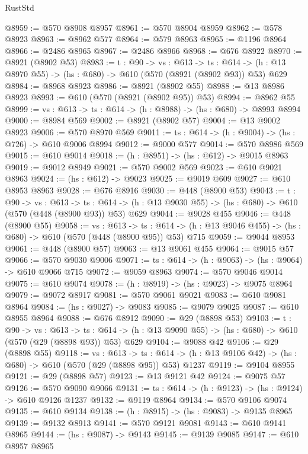 \begin{lexlean}{RustStd}
\begin{coremodule}
@8959 := @570 @8908 @8957
@8961 := @570 @8904 @8959
@8962 := @578 @8923
@8963 := @8962 @577
@8964 := @579 @8963
@8965 := @1196 @8964
@8966 := @2486 @8965
@8967 := @2486 @8966
@8968 := @676 @8922
@8970 := @8921 (@8902 @53)
@8983 := {t : @90} ->
  {vs : @613} ->
  {ts : @614} -> (h : @13 @8970 @55) -> (hs : @680) -> @610 (@570 (@8921 (@8902 @93)) @53) @629
@8984 := @8968 @8923
@8986 := @8921 (@8902 @55)
@8988 := @13 @8986 @8923
@8993 := @610 (@570 (@8921 (@8902 @95)) @53)
@8994 := @8962 @55
@8999 := {vs : @613} -> {ts : @614} -> (h : @8988) -> (hs : @680) -> @8993 @8994
@9000 := @8984 @569
@9002 := @8921 (@8902 @57)
@9004 := @13 @9002 @8923
@9006 := @570 @8970 @569
@9011 := {ts : @614} -> (h : @9004) -> (hs : @726) -> @610 @9006 @8994
@9012 := @9000 @577
@9014 := @570 @8986 @569
@9015 := @610 @9014
@9018 := (h : @8951) -> (hs : @612) -> @9015 @8963
@9019 := @9012 @8949
@9021 := @570 @9002 @569
@9023 := @610 @9021 @8963
@9024 := (hs : @612) -> @9023
@9025 := @9019 @609
@9027 := @610 @8953 @8963
@9028 := @676 @8916
@9030 := @448 (@8900 @53)
@9043 := {t : @90} ->
  {vs : @613} ->
  {ts : @614} -> (h : @13 @9030 @55) -> (hs : @680) -> @610 (@570 (@448 (@8900 @93)) @53) @629
@9044 := @9028 @455
@9046 := @448 (@8900 @55)
@9058 := {vs : @613} ->
  {ts : @614} -> (h : @13 @9046 @455) -> (hs : @680) -> @610 (@570 (@448 (@8900 @95)) @53) @715
@9059 := @9044 @8953
@9061 := @448 (@8900 @57)
@9063 := @13 @9061 @455
@9064 := @9015 @57
@9066 := @570 @9030 @9006
@9071 := {ts : @614} -> (h : @9063) -> (hs : @9064) -> @610 @9066 @715
@9072 := @9059 @8963
@9074 := @570 @9046 @9014
@9075 := @610 @9074
@9078 := (h : @8919) -> (hs : @9023) -> @9075 @8964
@9079 := @9072 @8917
@9081 := @570 @9061 @9021
@9083 := @610 @9081 @8964
@9084 := (hs : @9027) -> @9083
@9085 := @9079 @9025
@9087 := @610 @8955 @8964
@9088 := @676 @8912
@9090 := @29 (@8898 @53)
@9103 := {t : @90} ->
  {vs : @613} ->
  {ts : @614} -> (h : @13 @9090 @55) -> (hs : @680) -> @610 (@570 (@29 (@8898 @93)) @53) @629
@9104 := @9088 @42
@9106 := @29 (@8898 @55)
@9118 := {vs : @613} ->
  {ts : @614} -> (h : @13 @9106 @42) -> (hs : @680) -> @610 (@570 (@29 (@8898 @95)) @53) @1237
@9119 := @9104 @8955
@9121 := @29 (@8898 @57)
@9123 := @13 @9121 @42
@9124 := @9075 @57
@9126 := @570 @9090 @9066
@9131 := {ts : @614} -> (h : @9123) -> (hs : @9124) -> @610 @9126 @1237
@9132 := @9119 @8964
@9134 := @570 @9106 @9074
@9135 := @610 @9134
@9138 := (h : @8915) -> (hs : @9083) -> @9135 @8965
@9139 := @9132 @8913
@9141 := @570 @9121 @9081
@9143 := @610 @9141 @8965
@9144 := (hs : @9087) -> @9143
@9145 := @9139 @9085
@9147 := @610 @8957 @8965

\end{coremodule}
\end{lexlean}
